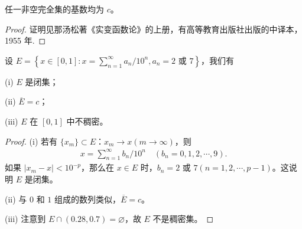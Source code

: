 \documentclass[../../main.tex]{subfiles}%
\begin{document}
\begin{proposition}
任一非空完全集的基数均为 \(c\)。
\end{proposition}
\begin{proof}

证明见那汤松著《实变函数论》的上册，有高等教育出版社出版的中译本，1955 年.

\end{proof}

\begin{example}
设 \(E = \left\{x\in[0,1]: x = \sum_{n = 1}^{\infty}a_n/10^n, a_n = 2 \text{ 或 } 7\right\}\)，我们有

(i) \(E\) 是闭集； 

(ii) \(\overline{E}=c\)； 

(iii) \(E\) 在 \([0,1]\) 中不稠密。
\end{example}
\begin{proof}

(i) 若有 \(\{x_m\}\subset E\)：\(x_m\rightarrow x (m\rightarrow\infty)\)，则
\begin{align*}
x = \sum_{n = 1}^{\infty}b_n/10^n \quad (b_n = 0,1,2,\cdots,9).
\end{align*}
如果 \(|x_m - x|<10^{-p}\)，那么在 \(x\in E\) 时，\(b_n = 2 \text{ 或 } 7 (n = 1,2,\cdots,p - 1)\)。这说明 \(E\) 是闭集。

(ii) 与 \(0\) 和 \(1\) 组成的数列类似，\(\overline{E}=c\)。

(iii) 注意到 \(E\cap(0.28,0.7)=\varnothing\)，故 \(E\) 不是稠密集。 

\end{proof}
\end{document}
